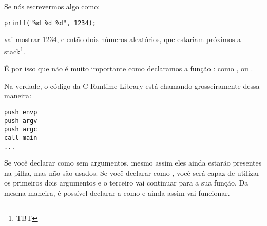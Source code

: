 Se nós escrevermos algo como:

\begin{lstlisting}
printf("%d %d %d", 1234);
\end{lstlisting}

\printf vai mostrar 1234, e então dois números aleatórios, que estariam próximos a stack\footnote{\ac{TBT}}.

\par
É por isso que não é muito importante como declaramos a função \main{}: como \main{},  ou .

Na verdade, o código da C Runtime Library está chamando grosseiramente \main{} dessa maneira:
	
\begin{lstlisting}[style=customasmx86]
push envp
push argv
push argc
call main
...
\end{lstlisting}

Se você declarar \main como \main sem argumentos, mesmo assim eles ainda estarão presentes na pilha, mas não são usados.
Se você declarar \main como , você será capaz de utilizar os primeiros dois argumentos e o terceiro vai continuar  para a sua função.
Da mesma maneira, é possível declarar a \main como  e ainda assim vai funcionar.

